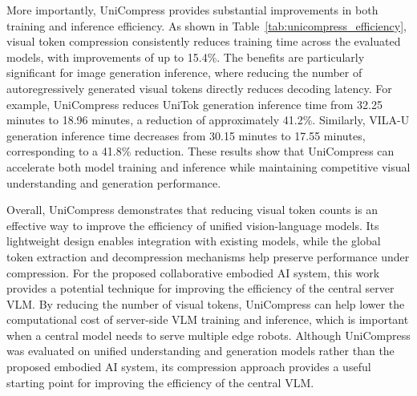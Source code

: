 \documentclass[11pt]{article}
\begin{document}
More importantly, UniCompress provides substantial improvements in both training and inference efficiency. As shown in Table~\ref{tab:unicompress_efficiency}, visual token compression consistently reduces training time across the evaluated models, with improvements of up to 15.4\%. The benefits are particularly significant for image generation inference, where reducing the number of autoregressively generated visual tokens directly reduces decoding latency. For example, UniCompress reduces UniTok generation inference time from 32.25 minutes to 18.96 minutes, a reduction of approximately 41.2\%. Similarly, VILA-U generation inference time decreases from 30.15 minutes to 17.55 minutes, corresponding to a 41.8\% reduction. These results show that UniCompress can accelerate both model training and inference while maintaining competitive visual understanding and generation performance.

\begin{table}[t]
\centering
\caption{Training and inference efficiency of UniCompress. The compressed models use approximately $4\times$ fewer local visual tokens.}
\label{tab:unicompress_efficiency}
\end{table}

Overall, UniCompress demonstrates that reducing visual token counts is an effective way to improve the efficiency of unified vision-language models. Its lightweight design enables integration with existing models, while the global token extraction and decompression mechanisms help preserve performance under compression. For the proposed collaborative embodied AI system, this work provides a potential technique for improving the efficiency of the central server VLM. By reducing the number of visual tokens, UniCompress can help lower the computational cost of server-side VLM training and inference, which is important when a central model needs to serve multiple edge robots. Although UniCompress was evaluated on unified understanding and generation models rather than the proposed embodied AI system, its compression approach provides a useful starting point for improving the efficiency of the central VLM.
\end{document}
